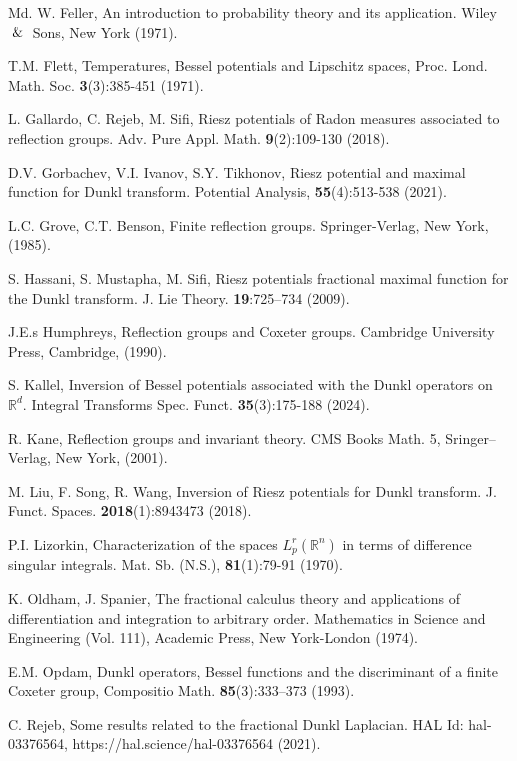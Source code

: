 \documentclass[11pt,a4paper,reqno]{amsproc}
\theoremstyle{definition}
\theoremstyle{remark}
\numberwithin{equation}{section}
\begin{document}
\begin{thebibliography}{Md.}
 W. Feller, An introduction to probability theory and its application.  Wiley $\And$ Sons, New York  (1971).

 T.M. Flett, Temperatures, Bessel potentials and Lipschitz spaces, Proc. Lond. Math. Soc. \textbf{3}(3):385-451 (1971).

L. Gallardo, C. Rejeb, M. Sifi, Riesz potentials of Radon measures associated to reflection groups. Adv. Pure Appl. Math. \textbf{9}(2):109-130 (2018).

D.V. Gorbachev, V.I. Ivanov, S.Y. Tikhonov,  Riesz potential and maximal function for Dunkl transform. Potential Analysis, \textbf{55}(4):513-538 (2021). 

  L.C. Grove,  C.T. Benson,  Finite reflection groups. Springer-Verlag, New York, (1985).

 S. Hassani, S. Mustapha, M. Sifi,  Riesz potentials fractional maximal function for the Dunkl transform. J. Lie Theory. \textbf{19}:725–734 (2009).

J.E.s Humphreys, Reflection groups and Coxeter groups. Cambridge University Press, Cambridge, (1990).

S. Kallel, Inversion of Bessel potentials associated with the Dunkl operators on $\mathbb{R}^d.$ Integral Transforms Spec. Funct. \textbf{35}(3):175-188 (2024).

 R. Kane, Reflection groups and invariant theory. CMS Books Math. 5, Sringer–Verlag, New York, (2001).

 M. Liu, F. Song, R. Wang,  Inversion of Riesz potentials for Dunkl transform. J. Funct. Spaces. \textbf{2018}(1):8943473 (2018).

 P.I. Lizorkin, Characterization of the spaces $L^r_p (\mathbb{R}^n)$ in terms of difference singular integrals. Mat. Sb. (N.S.), \textbf{81}(1):79-91 (1970).


 K. Oldham, J. Spanier,  The fractional calculus theory and applications of differentiation and integration to arbitrary order. Mathematics in Science and Engineering (Vol. 111), Academic Press, New York-London (1974).

 E.M. Opdam, Dunkl operators, Bessel functions and the discriminant of a finite Coxeter group, Compositio Math. \textbf{85}(3):333–373 (1993).

C. Rejeb, Some results related to the fractional Dunkl Laplacian. HAL Id: hal-03376564, https://hal.science/hal-03376564 (2021).


\end{thebibliography}
\end{document}
